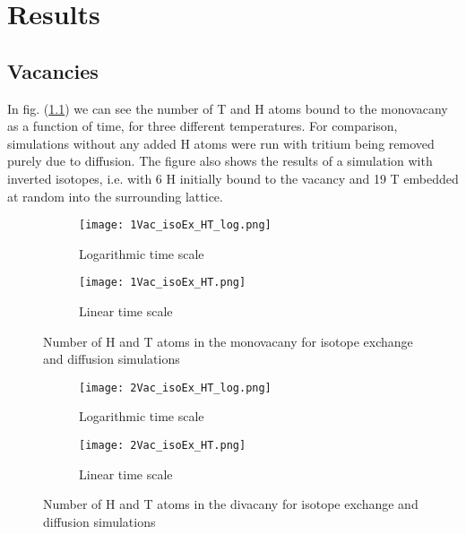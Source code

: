 \chapter{Results}

\section{Vacancies}
In fig. (\ref{Fig:1Vac_results}) we can see the number of T and H atoms bound to the monovacany as a function of time, for three different temperatures. For comparison, simulations without any added H atoms were run with tritium being removed purely due to diffusion. The figure also shows the results of a simulation with inverted isotopes, i.e. with 6 H initially bound to the vacancy and 19 T embedded at random into the surrounding lattice.

\begin{figure}[ht]
\begin{subfigure}{.5\textwidth}
  \centering
  \texttt{[image: 1Vac\_isoEx\_HT\_log.png]}  
  \caption{Logarithmic time scale}
\end{subfigure}
\begin{subfigure}{.5\textwidth}
  \centering
  \texttt{[image: 1Vac\_isoEx\_HT.png]}  
  \caption{Linear time scale}
\end{subfigure}
\caption{Number of H and T atoms in the monovacany for isotope exchange and diffusion simulations}
 \label{Fig:1Vac_results} 
\end{figure}


\begin{figure}[ht]
\begin{subfigure}{.5\textwidth}
  \centering
 \texttt{[image: 2Vac\_isoEx\_HT\_log.png]}  
  \caption{Logarithmic time scale}
\end{subfigure}
\begin{subfigure}{.5\textwidth}
  \centering
  \texttt{[image: 2Vac\_isoEx\_HT.png]}  
  \caption{Linear time scale}
\end{subfigure}
   \caption{Number of H and T atoms in the divacany for isotope exchange and diffusion simulations}
   \label{Fig:2Vac_results} 
\end{figure}

